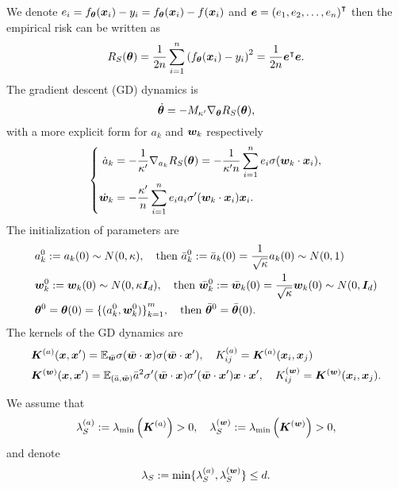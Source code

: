 \documentclass{article}
\begin{document}
We denote $e_i = f_{\bm{\theta}}(\bm{x}_i) - y_i = f_{\bm{\theta}}(\bm{x}_i) - f(\bm{x}_i)$ and $\bm{e} = {(e_1, e_2, \ldots, e_n)}^{\intercal}$ then the empirical risk can be written as
\begin{equation}
    R_S(\bm{\theta}) = \frac{1}{2n}\sum_{i=1}^n{\left(f_{\bm{\theta}}(\bm{x}_i)-y_i\right)}^2 = \frac{1}{2n}\bm{e}^{\intercal}\bm{e}.
\end{equation}
The gradient descent (GD) dynamics is
\begin{equation}\label{eqn:gd_dyn}
    \dot{\bm{\theta}} = -M_{\kappa'}\nabla_{\bm{\theta}}R_S(\bm{\theta}),
\end{equation}
with a more explicit form for $a_k$ and $\bm{w}_k$ respectively
\begin{equation}
    \left \{
    \begin{aligned}
        \dot{a}_k   & = -\frac{1}{\kappa'}\nabla_{a_k}R_S(\bm{\theta}) = -\frac{1}{\kappa'n}\sum_{i=1}^{n}e_i\sigma(\bm{w}_k\cdot\bm{x}_i), \\
        \dot{\bm{w}}_k & = -\frac{\kappa'}{n}\sum_{i=1}^n e_i a_i\sigma'(\bm{w}_k\cdot\bm{x}_i)\bm{x}_i.
    \end{aligned}
    \right.
\end{equation}
The initialization of parameters are
\begin{align}
     & a^0_k:=a_k(0)\sim N(0,\kappa),\quad\text{then }\bar{a}_k^0:=\bar{a}_k(0)=\frac{1}{\sqrt{\kappa}}a_k(0)\sim N(0,1)                     \\
     & \bm{w}_k^0:=\bm{w}_k(0)\sim N(0, \kappa\bm{I}_d),\quad\text{then }\bar{\bm{w}}_k^0:=\bar{\bm{w}}_k(0)=\frac{1}{\sqrt{\kappa}}\bm{w}_k(0)\sim N(0,\bm{I}_d) \\
     & \bm{\theta}^0 = \bm{\theta}(0) = {\{(a_k^0, \bm{w}_k^0)\}}_{k=1}^m, \quad\text{then }\bar{\bm{\theta}}^0=\bar{\bm{\theta}}(0).
\end{align}
The kernels of the GD dynamics are
\begin{equation}
    \begin{aligned}
         & \bm{K}^{(a)}(\bm{x},\bm{x}')=\mathbb{E}_{\bar{\bm{w}}}\sigma(\bar{\bm{w}}\cdot\bm{x})\sigma(\bar{\bm{w}}\cdot\bm{x}'),\quad K^{(a)}_{ij}=\bm{K}^{(a)}(\bm{x}_i,\bm{x}_j)                                         \\
         & \bm{K}^{(\bm{w})}(\bm{x},\bm{x}')=\mathbb{E}_{(\bar{a},\bar{\bm{w}})}\bar{a}^2\sigma'(\bar{\bm{w}}\cdot\bm{x})\sigma'(\bar{\bm{w}}\cdot\bm{x}')\bm{x}\cdot\bm{x}',\quad K^{(\bm{w})}_{ij}=\bm{K}^{(\bm{w})}(\bm{x}_i,\bm{x}_j). \\
    \end{aligned}
\end{equation}
\begin{assump}
    We assume that
    \begin{equation}
        \lambda_S^{(a)} := \lambda_{\min}\left(\bm{K}^{(a)}\right) > 0,\quad \lambda_S^{(\bm{w})} := \lambda_{\min}\left(\bm{K}^{(\bm{w})}\right) > 0,
    \end{equation}
    and denote
    \begin{equation}
        \lambda_S:=\min \{\lambda_S^{(a)},\lambda_S^{(\bm{w})}\}\leq d.
    \end{equation}
\end{assump}
\end{document}
